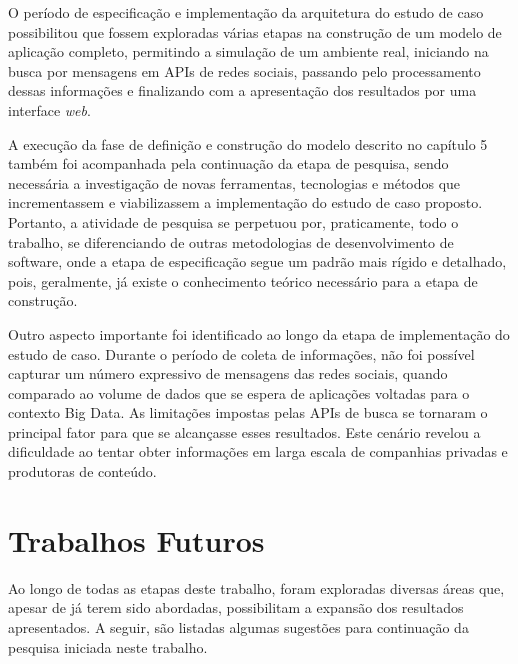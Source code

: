O período de especificação e implementação da arquitetura do estudo de caso possibilitou que fossem exploradas várias etapas na construção de um modelo de aplicação completo, permitindo a simulação de um ambiente real, iniciando na busca por mensagens em APIs de redes sociais, passando pelo processamento dessas informações e finalizando com a apresentação dos resultados por uma interface \textit{web}.

A execução da fase de definição e construção do modelo descrito no capítulo 5 também foi acompanhada pela continuação da etapa de pesquisa, sendo necessária a investigação de novas ferramentas, tecnologias e métodos que incrementassem e viabilizassem a implementação do estudo de caso proposto. Portanto, a atividade de pesquisa se perpetuou por, praticamente, todo o trabalho, se diferenciando de outras metodologias de desenvolvimento de software, onde a etapa de especificação segue um padrão mais rígido e detalhado, pois, geralmente, já existe o conhecimento teórico necessário para a etapa de construção.

Outro aspecto importante foi identificado ao longo da etapa de implementação do estudo de caso. Durante o período de coleta de informações, não foi possível capturar um número expressivo de mensagens das redes sociais, quando comparado ao volume de dados que se espera de aplicações voltadas para o contexto Big Data. As limitações impostas pelas APIs de busca se tornaram o principal fator para que se alcançasse esses resultados. Este cenário revelou a dificuldade ao tentar obter informações em larga escala de companhias privadas e produtoras de conteúdo.

\section{Trabalhos Futuros}

Ao longo de todas as etapas deste trabalho, foram exploradas diversas áreas que, apesar de já terem sido abordadas, possibilitam a expansão dos resultados apresentados. A seguir, são listadas algumas sugestões para continuação da pesquisa iniciada neste trabalho.

